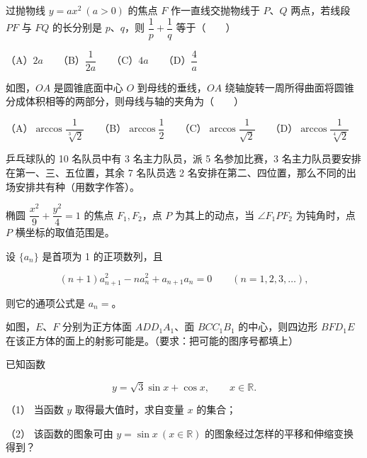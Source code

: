 \begin{question}
过抛物线 $y=ax^2\ (a>0)$ 的焦点 $F$ 作一直线交抛物线于 $P$、$Q$ 两点，若线段 $PF$ 与 $FQ$ 的长分别是 $p$、$q$，则 $\dfrac1p+\dfrac1q$ 等于\mbox{（　　）}

（A）$2a$　　（B）$\dfrac1{2a}$　　（C）$4a$　　（D）$\dfrac4a$

\Needspace{0.4\textheight}
\end{question}
\begin{question}
如图，$OA$ 是圆锥底面中心 $O$ 到母线的垂线，$OA$ 绕轴旋转一周所得曲面将圆锥分成体积相等的两部分，则母线与轴的夹角为\mbox{（　　）}
\nopagebreak[4]
\begin{center}\end{center}
\nopagebreak[4]
（A）$\arccos\dfrac1{\sqrt[3]{2}}$　　（B）$\arccos\dfrac12$　　（C）$\arccos\dfrac1{\sqrt2}$　　（D）$\arccos\dfrac1{\sqrt[4]{2}}$

\end{question}

\begin{question}
乒乓球队的 10 名队员中有 3 名主力队员，派 5 名参加比赛，3 名主力队员要安排在第一、三、五位置，其余 7 名队员选 2 名安排在第二、四位置，那么不同的出场安排共有\gkblank{}种（用数字作答）。

\end{question}
\begin{question}
椭圆 $\dfrac{x^2}{9}+\dfrac{y^2}{4}=1$ 的焦点 $F_1,F_2$，点 $P$ 为其上的动点，当 $\angle F_1PF_2$ 为钝角时，点 $P$ 横坐标的取值范围是\gkblank{}。

\end{question}
\begin{question}
设 $\{a_n\}$ 是首项为 1 的正项数列，且

\nopagebreak[4]
\[
(n+1)a_{n+1}^2-na_n^2+a_{n+1}a_n=0
\qquad(n=1,2,3,\ldots),
\]

则它的通项公式是 $a_n=$\gkblank{}。

\Needspace{0.4\textheight}
\end{question}
\begin{question}
如图，$E$、$F$ 分别为正方体面 $ADD_1A_1$、面 $BCC_1B_1$ 的中心，则四边形 $BFD_1E$ 在该正方体的面上的射影可能是\gkblank{}。（要求：把可能的图序号都填上）
\nopagebreak[4]
\begin{center}\end{center}
\nopagebreak[4]
\end{question}
\begin{question}
已知函数

\nopagebreak[4]
\[
y=\sqrt3\sin x+\cos x,\qquad x\in\mathbb R.
\]

（1） 当函数 $y$ 取得最大值时，求自变量 $x$ 的集合；

（2） 该函数的图象可由 $y=\sin x\ (x\in\mathbb R)$ 的图象经过怎样的平移和伸缩变换得到？

\end{question}

